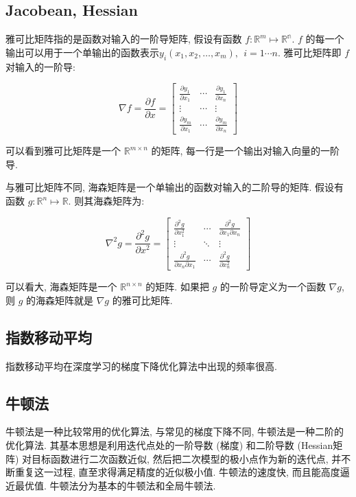 \subsection{Jacobean, Hessian}
雅可比矩阵指的是函数对输入的一阶导矩阵, 假设有函数 $f: \mathbb{R}^m \longmapsto \mathbb{{R}^n}$. $f$ 的每一个输出可以用于一个单输出的函数表示$y_i(x_1, x_2, \dots, x_m),\ \ i=1\cdots n$. 雅可比矩阵即 $f$ 对输入的一阶导:

$$
\nabla f = \frac{\partial f}{\partial x} = \left[\begin{array}{ccc}
	\frac{\partial y_{1}}{\partial x_{1}} & \cdots & \frac{\partial y_{1}}{\partial x_{n}} \\
	\vdots & \cdots & \vdots \\
	\frac{\partial y_{m}}{\partial x_{1}} & \cdots & \frac{\partial y_{m}}{\partial x_{n}}
\end{array}\right]
$$

可以看到雅可比矩阵是一个 $\mathbb{R}^{m \times n}$ 的矩阵, 每一行是一个输出对输入向量的一阶导.

与雅可比矩阵不同, 海森矩阵是一个单输出的函数对输入的二阶导的矩阵. 假设有函数 $g: \mathbb{R}^n \longmapsto \mathbb{R}$. 则其海森矩阵为:

$$
\nabla^2 g = \frac{\partial^2 g}{\partial x^2}=\left[\begin{array}{ccc}
	\frac{\partial^{2} g}{\partial x_{1}^{2}} & \cdots & \frac{\partial^{2} g}{\partial x_{1} \partial x_{n}} \\
	\vdots & \ddots & \vdots \\
	\frac{\partial^{2} g}{\partial x_{n} \partial x_{1}} & \cdots & \frac{\partial^{2} g}{\partial x_{n}^{2}}
\end{array}\right]
$$

可以看大, 海森矩阵是一个 $\mathbb{R}^{n \times n}$ 的矩阵. 如果把 $g$ 的一阶导定义为一个函数 $\nabla g$, 则 $g$ 的海森矩阵就是 $\nabla g$ 的雅可比矩阵.

\subsection{指数移动平均}
指数移动平均在深度学习的梯度下降优化算法中出现的频率很高. 

\subsection{牛顿法}
牛顿法是一种比较常用的优化算法, 与常见的梯度下降不同, 牛顿法是一种二阶的优化算法. 其基本思想是利用迭代点处的一阶导数 (梯度) 和二阶导数 (Hessian矩阵) 对目标函数进行二次函数近似, 然后把二次模型的极小点作为新的迭代点, 并不断重复这一过程, 直至求得满足精度的近似极小值. 牛顿法的速度快, 而且能高度逼近最优值. 牛顿法分为基本的牛顿法和全局牛顿法.

